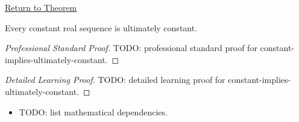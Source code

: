 \newpage
{}
\label{prf:constant-implies-ultimately-constant}

\begin{remark*}[Return]
\hyperref[thm:constant-implies-ultimately-constant]{Return to Theorem}
\end{remark*}

\begin{theorem*}
Every constant real sequence is ultimately constant.

\smallskip
\noindent
\end{theorem*}

\begin{proof}[Professional Standard Proof]
\LRAProofBodyStart
TODO: professional standard proof for constant-implies-ultimately-constant.
\end{proof}

\begin{proof}[Detailed Learning Proof]
\LRAProofBodyStart
TODO: detailed learning proof for constant-implies-ultimately-constant.
\end{proof}

\begin{remark*}
\end{remark*}

\begin{dependencies}
\begin{itemize}
  \item TODO: list mathematical dependencies.
\end{itemize}
\end{dependencies}

\clearpage
